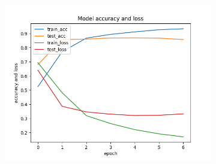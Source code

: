 \documentclass[11pt]{article}
\begin{document}
\begin{figure}[h!]
\begin{subfigure}{0.35\textwidth}
\includegraphics[width=\textwidth]{model16.png}


\end{subfigure}
\end{figure}
\end{document}
